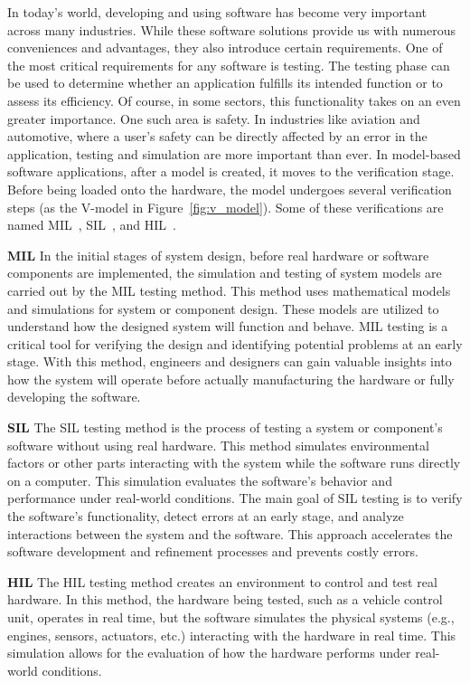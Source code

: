 In today's world, developing and using software has become very important across many industries. While these software solutions provide us with numerous conveniences and advantages, they also introduce certain requirements. One of the most critical requirements for any software is testing. The testing phase can be used to determine whether an application fulfills its intended function or to assess its efficiency. Of course, in some sectors, this functionality takes on an even greater importance. One such area is safety. In industries like aviation and automotive, where a user's safety can be directly affected by an error in the application, testing and simulation are more important than ever. In model-based software applications, after a model is created, it moves to the verification stage. Before being loaded onto the hardware, the model undergoes several verification steps (as the V-model in Figure~\ref{fig:v_model}). Some of these verifications are named \ac{MIL}~\cite{plummer-2006}, \ac{SIL}~\cite{4455268}, and \ac{HIL}~\cite{fathy-2006}.

\textbf{\acs{MIL}} In the initial stages of system design, before real hardware or software components are implemented, the simulation and testing of system models are carried out by the \ac{MIL} testing method. This method uses mathematical models and simulations for system or component design. These models are utilized to understand how the designed system will function and behave. \ac{MIL} testing is a critical tool for verifying the design and identifying potential problems at an early stage. With this method, engineers and designers can gain valuable insights into how the system will operate before actually manufacturing the hardware or fully developing the software.

\textbf{\acs{SIL}} The \ac{SIL} testing method is the process of testing a system or component's software without using real hardware. This method simulates environmental factors or other parts interacting with the system while the software runs directly on a computer. This simulation evaluates the software's behavior and performance under real-world conditions. The main goal of \ac{SIL} testing is to verify the software's functionality, detect errors at an early stage, and analyze interactions between the system and the software. This approach accelerates the software development and refinement processes and prevents costly errors.

\textbf{\acs{HIL}} The \ac{HIL} testing method creates an environment to control and test real hardware. In this method, the hardware being tested, such as a vehicle control unit, operates in real time, but the software simulates the physical systems (e.g., engines, sensors, actuators, etc.) interacting with the hardware in real time. This simulation allows for the evaluation of how the hardware performs under real-world conditions.

